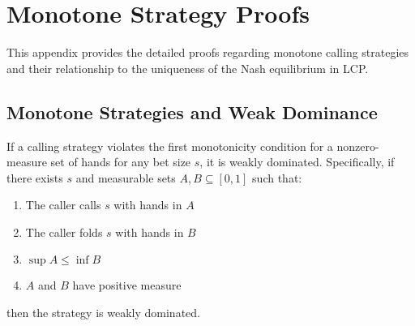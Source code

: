 \documentclass[../../main/main.tex]{subfiles}
\begin{document}
\section{Monotone Strategy Proofs}
\label{sec:monotone_proofs}

This appendix provides the detailed proofs regarding monotone calling strategies and their relationship to the uniqueness of the Nash equilibrium in LCP.

\subsection{Monotone Strategies and Weak Dominance}

\begin{lemma}
    \label{lem:monotone_dominated}
    If a calling strategy violates the first monotonicity condition for a nonzero-measure set of hands for any bet size $s$, it is weakly dominated. Specifically, if there exists $s$ and measurable sets $A, B \subseteq [0, 1]$ such that:
    \begin{enumerate}
        \item The caller calls $s$ with hands in $A$
        \item The caller folds $s$ with hands in $B$
        \item $\sup A \leq \inf B$
        \item $A$ and $B$ have positive measure
    \end{enumerate}
    then the strategy is weakly dominated.
\end{lemma}
\end{document}
